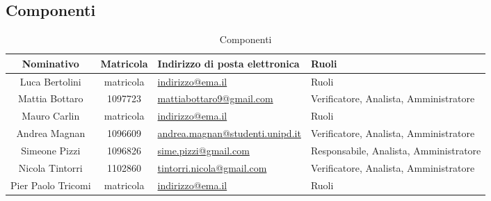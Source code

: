 \documentclass[a4paper,titlepage]{article}
\begin{document}
\subsection{Componenti}
\begin{table}[H]
	\begin{center}
		\setlength{\extrarowheight}{\jot}
		\begin{tabular}{|c|c|p{5cm}|p{4.3cm}|}
			\hline
			\textbf{Nominativo} & \textbf{Matricola} & \raggedright \textbf{Indirizzo di posta elettronica} & \textbf{Ruoli} \\[1ex]
			\hline
	 		Luca Bertolini & matricola	& \href{mailto:indirizzo@ema.il}{indirizzo@ema.il} & Ruoli \\[1ex]
			\hline
			Mattia Bottaro & 1097723	& \href{mailto:mattiabottaro9@gmail.com}{mattiabottaro9@gmail.com} & Verificatore, Analista, Amministratore  \\[1ex]
			\hline
			Mauro Carlin & matricola	& \href{mailto:indirizzo@ema.il}{indirizzo@ema.il} & Ruoli	\\[1ex]
			\hline
			Andrea Magnan & 1096609 & \href{mailto:andrea.magnan@studenti.unipd.it}{andrea.magnan@studenti.unipd.it} & Verificatore, Analista, Amministratore	\\[1ex]
			\hline
			Simeone Pizzi & 1096826	& \href{mailto:sime.pizzi@gmail.com}{sime.pizzi@gmail.com} 	& Responsabile, Analista, Amministratore 	\\[1ex]
			\hline
			Nicola Tintorri	& 1102860 & \href{mailto:tintorri.nicola@gmail.com}{tintorri.nicola@gmail.com} & Verificatore, Analista, Amministratore 	\\[1ex]
			\hline
			Pier Paolo Tricomi	& matricola	& \href{mailto:indirizzo@ema.il}{indirizzo@ema.il} & Ruoli \\[1ex]
			\hline	
		\end{tabular}
	\end{center}
	\caption{Componenti}
\end{table}
\end{document}
